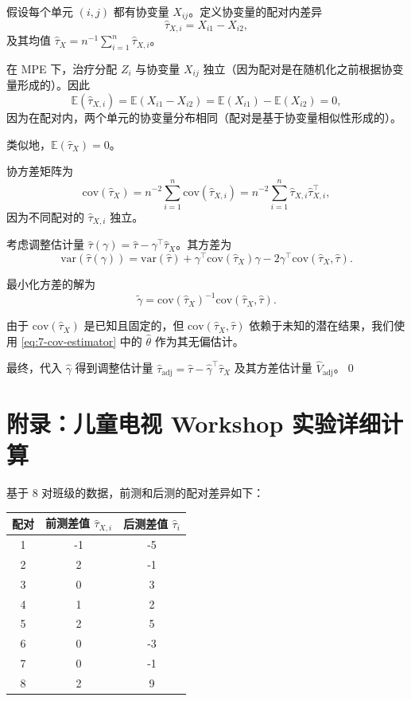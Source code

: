 假设每个单元 $(i,j)$ 都有协变量 $X_{ij}$。定义协变量的配对内差异
\[
\hat\tau_{X,i} = X_{i1} - X_{i2},
\]
及其均值 $\hat\tau_X = n^{-1} \sum_{i=1}^n \hat\tau_{X,i}$。

在 MPE 下，治疗分配 $Z_i$ 与协变量 $X_{ij}$ 独立（因为配对是在随机化之前根据协变量形成的）。因此
\[
\mathbb{E}(\hat\tau_{X,i}) = \mathbb{E}(X_{i1} - X_{i2}) = \mathbb{E}(X_{i1}) - \mathbb{E}(X_{i2}) = 0,
\]
因为在配对内，两个单元的协变量分布相同（配对是基于协变量相似性形成的）。

类似地，$\mathbb{E}(\hat\tau_X) = 0$。

协方差矩阵为
\[
\text{cov}(\hat\tau_X) = n^{-2} \sum_{i=1}^n \text{cov}(\hat\tau_{X,i}) = n^{-2} \sum_{i=1}^n \hat\tau_{X,i} \hat\tau_{X,i}^\top,
\]
因为不同配对的 $\hat\tau_{X,i}$ 独立。

考虑调整估计量 $\hat\tau(\gamma) = \hat\tau - \gamma^\top \hat\tau_X$。其方差为
\[
\text{var}(\hat\tau(\gamma)) = \text{var}(\hat\tau) + \gamma^\top \text{cov}(\hat\tau_X) \gamma - 2\gamma^\top \text{cov}(\hat\tau_X, \hat\tau).
\]

最小化方差的解为
\[
\tilde\gamma = \text{cov}(\hat\tau_X)^{-1} \text{cov}(\hat\tau_X, \hat\tau).
\]

由于 $\text{cov}(\hat\tau_X)$ 是已知且固定的，但 $\text{cov}(\hat\tau_X, \hat\tau)$ 依赖于未知的潜在结果，我们使用 \cref{eq:7-cov-estimator} 中的 $\hat\theta$ 作为其无偏估计。

最终，代入 $\hat\gamma$ 得到调整估计量 $\hat\tau_{\text{adj}} = \hat\tau - \hat\gamma^\top \hat\tau_X$ 及其方差估计量 $\hat V_{\text{adj}}$。\qed

\section{附录：儿童电视 Workshop 实验详细计算}\label{sec:appendix-7-ctw-example}

基于 8 对班级的数据，前测和后测的配对差异如下：

\begin{center}
\begin{tabular}{c|cc}
配对 & 前测差值 $\hat\tau_{X,i}$ & 后测差值 $\hat\tau_i$ \\ \hline
1 & -1 & -5 \\
2 & 2 & -1 \\
3 & 0 & 3 \\
4 & 1 & 2 \\
5 & 2 & 5 \\
6 & 0 & -3 \\
7 & 0 & -1 \\
8 & 2 & 9
\end{tabular}
\end{center}

